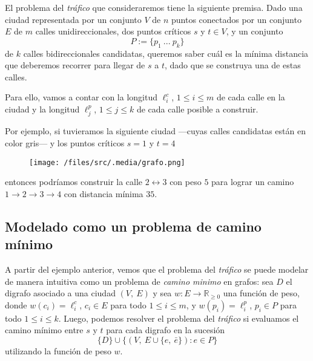 El problema del \textit{tráfico} que consideraremos tiene la siguiente premisa. Dado una ciudad representada por un conjunto $V$ de $n$ puntos conectados por un conjunto $E$ de $m$ calles unidireccionales, dos puntos críticos $s$ y $t \in V$, y un conjunto
\begin{equation*}
    P := \{p_1 \ ... \ p_k\}    
\end{equation*}
de $k$ calles bidireccionales candidatas, queremos saber cuál es la mínima distancia que deberemos recorrer para llegar de $s$ a $t$, dado que se construya una de estas calles.

Para ello, vamos a contar con la longitud $\ell^c_i$, $1 \leq i \leq m$ de cada calle en la ciudad y la longitud $\ell^p_j$, $1 \leq j \leq k$ de cada calle posible a construir.

Por ejemplo, si tuvieramos la siguiente ciudad ---cuyas calles candidatas están en color gris--- y los puntos críticos $s = 1$ y $t = 4$

\begin{figure}[!htbp]
    \texttt{[image: /files/src/.media/grafo.png]} 
\end{figure}
    
\noindent entonces podríamos construir la calle $2 \leftrightarrow 3$ con peso $5$ para lograr un camino $1 \to 2 \to 3 \to 4$ con distancia mínima $35$.

\subsection{Modelado como un problema de camino mínimo}\label{modelo} 

A partir del ejemplo anterior, vemos que el problema del \textit{tráfico} se puede modelar de manera intuitiva como un problema de \textit{camino minimo} en grafos: sea $D$ el digrafo asociado a una ciudad $(V,\ E)$ y sea $w: E \to \mathbb{R}_{\geq 0}$ una función de peso, donde $w(c_i) = \ell^c_i$, $c_i \in E$ para todo $1 \leq i \leq m$, y $w(p_i) = \ell^p_i$, $p_i \in P$ para todo $1 \leq i \leq k$. Luego, podemos resolver el problema del \textit{tráfico} si evaluamos el camino mínimo entre $s$ y $t$ para cada digrafo en la sucesión
\begin{equation}\label{eq_1}
    \{D\} \cup \{(V,\ E \cup \{e,\ \bar{e}\}) : e \in P\}
\end{equation}
utilizando la función de peso $w$.


